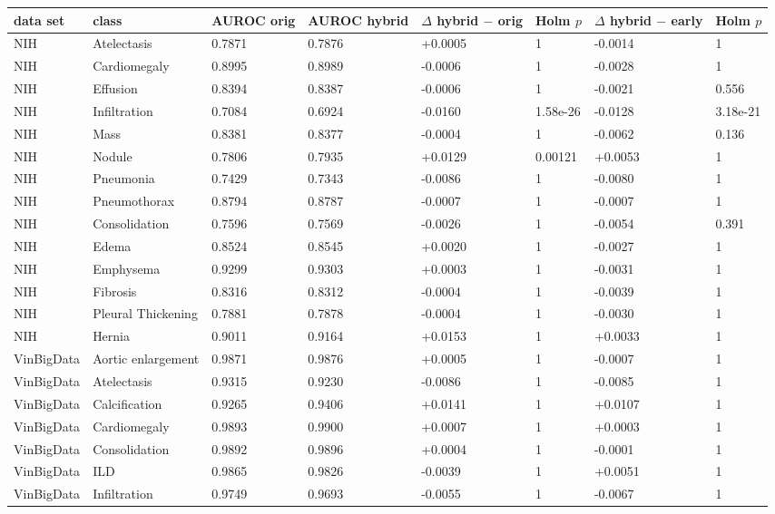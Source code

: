 \begin{tabular}{llllllll}
\toprule
data set & class & AUROC orig & AUROC hybrid & $\Delta$ hybrid $-$ orig & Holm $p$ & $\Delta$ hybrid $-$ early & Holm $p$ \\
\midrule
NIH & Atelectasis & 0.7871 & 0.7876 & +0.0005 & 1 & -0.0014 & 1 \\
NIH & Cardiomegaly & 0.8995 & 0.8989 & -0.0006 & 1 & -0.0028 & 1 \\
NIH & Effusion & 0.8394 & 0.8387 & -0.0006 & 1 & -0.0021 & 0.556 \\
NIH & Infiltration & 0.7084 & 0.6924 & -0.0160 & 1.58e-26 & -0.0128 & 3.18e-21 \\
NIH & Mass & 0.8381 & 0.8377 & -0.0004 & 1 & -0.0062 & 0.136 \\
NIH & Nodule & 0.7806 & 0.7935 & +0.0129 & 0.00121 & +0.0053 & 1 \\
NIH & Pneumonia & 0.7429 & 0.7343 & -0.0086 & 1 & -0.0080 & 1 \\
NIH & Pneumothorax & 0.8794 & 0.8787 & -0.0007 & 1 & -0.0007 & 1 \\
NIH & Consolidation & 0.7596 & 0.7569 & -0.0026 & 1 & -0.0054 & 0.391 \\
NIH & Edema & 0.8524 & 0.8545 & +0.0020 & 1 & -0.0027 & 1 \\
NIH & Emphysema & 0.9299 & 0.9303 & +0.0003 & 1 & -0.0031 & 1 \\
NIH & Fibrosis & 0.8316 & 0.8312 & -0.0004 & 1 & -0.0039 & 1 \\
NIH & Pleural Thickening & 0.7881 & 0.7878 & -0.0004 & 1 & -0.0030 & 1 \\
NIH & Hernia & 0.9011 & 0.9164 & +0.0153 & 1 & +0.0033 & 1 \\
VinBigData & Aortic enlargement & 0.9871 & 0.9876 & +0.0005 & 1 & -0.0007 & 1 \\
VinBigData & Atelectasis & 0.9315 & 0.9230 & -0.0086 & 1 & -0.0085 & 1 \\
VinBigData & Calcification & 0.9265 & 0.9406 & +0.0141 & 1 & +0.0107 & 1 \\
VinBigData & Cardiomegaly & 0.9893 & 0.9900 & +0.0007 & 1 & +0.0003 & 1 \\
VinBigData & Consolidation & 0.9892 & 0.9896 & +0.0004 & 1 & -0.0001 & 1 \\
VinBigData & ILD & 0.9865 & 0.9826 & -0.0039 & 1 & +0.0051 & 1 \\
VinBigData & Infiltration & 0.9749 & 0.9693 & -0.0055 & 1 & -0.0067 & 1 \\

\end{tabular}
